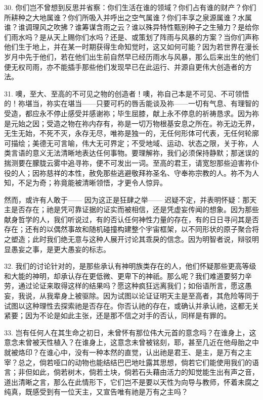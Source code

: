 30. 你们岂不曾想到反思并省察：你们生活在谁的领域？你们占有谁的财产？你们所耕种之大地属谁？你们所吸入并呼出之空气属谁？你们丰享之泉源属谁？水属谁？谁调理风之吹拂？谁筹谋含雨之云？谁以殊异特性甄别种子之生殖力？是给你们雨水吗？是从天上赐你们水吗？还是、或策划了阵雨与风暴的方案？当你们声称他们生于地上，并在某一时期获得生命知觉时，这又如何可能？因为若世界在漫长岁月中先于他们，若在他们出生前自然早已经历雨水与风暴，那么后来出生的他们便无权司雨，亦不能插手那些他们发现早已在此运行、并源自更伟大创造者的方法。\par

31. 噢，至大、至高的不可见之物的创造者！噢，祢自己本是不可见、不可领悟的！祢堪当，祢实在堪当——只要可朽的唇舌能谈及祢——一切有气息、有理智的受造，都应永不停止感受并感谢祢；毕生屈膝，献上永不停息的祈祷恳求。因为祢是元始之因；受造之物在祢内存有，祢是一切万物根基安息之所在。祢无边无界，无生无始，不死不灭，永存无尽，唯祢是独一的，无任何形体可代表，无任何轮廓可描绘；美德无可言喻，伟大无可界定；不受地域、运动、状态之限，关于祢，人类言语的意义无法清晰地表达任何事物。要理解祢，我们必须保持静默；那迷误的揣测要在朦胧云雾中追寻祢，便不可发出一词。至高的君王，请宽恕那些迫害祢仆役的人；因祢慈祥的本性，赦免那些逃避敬拜祢圣名、守奉祢宗教的人。祢不为人知，不足为奇；祢竟能被清晰领悟，才更令人惊异。\par

然而，或许有人敢于—— 因为这正是狂肆之举—— 迟疑不定，并表明怀疑：那天主是否存在；祂是凭可靠证据的证实而被相信，还是凭虚妄传闻的想象。因为那些献身哲学的人，我们听说过，有的否认任何神性力量的存在，有的日日寻问其是否存在；还有的以偶然事故和随机碰撞构建整个宇宙框架，以不同形状的原子聚合将之塑造；此时我们绝无意与这种人展开讨论其乖戾的信念。因为明智者说，辩驳明显愚妄之事，是更大愚妄的标志。\par

32. 我们的讨论针对的，是那些承认有神明族类存在的人，他们怀疑那些更高等级和大能的神明，却承认存在更低微、更卑下的神祇。那么呢？我们难道要努力辛劳，通过论证来取得这样的结果吗？愿这种疯狂远离我们；如俗语所言，愿这愚妄，我说，从我辈身上被驱除。因为试图以论证证明天主是至高者，其危险等同于试图以这种理性去探索祂是否存在。你否认祂的存在，或确认并承认祂，这都无关紧要；因为不论是如此主张，还是那不信之对手的否认，同样是有罪的。\par

33. 岂有任何人在其生命之初日，未曾怀有那位伟大元首的意念吗？在谁身上，这意念未曾被天性植入？在谁身上，这意念未曾被铭刻，耶，甚至几近在他母胎之中就被烙印？在谁心中，没有一种本然的直觉，认出祂是君王、是主，是万有之主宰？总之，倘若哑口的动物也能结结巴巴地吐露其思想，倘若它们能使用我们的语言；非但如此，倘若树木，倘若土块，倘若石头藉由活力的知觉能生出有声之音，道出清晰之言，那么在此情形下，它们岂不是要以天性为向导与教师，怀着未腐之纯真，既感受到有一位天主，又宣告唯有祂是万有之主吗？\par

